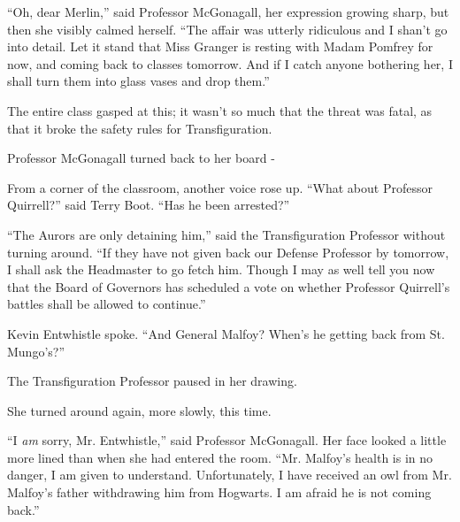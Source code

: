 ``Oh, dear Merlin,'' said Professor McGonagall, her expression growing
sharp, but then she visibly calmed herself. ``The affair was utterly
ridiculous and I shan't go into detail. Let it stand that Miss Granger
is resting with Madam Pomfrey for now, and coming back to classes
tomorrow. And if I catch anyone bothering her, I shall turn them into
glass vases and drop them.''

The entire class gasped at this; it wasn't so much that the threat was
fatal, as that it broke the safety rules for Transfiguration.

Professor McGonagall turned back to her board -

From a corner of the classroom, another voice rose up. ``What about
Professor Quirrell?'' said Terry Boot. ``Has he been arrested?''

``The Aurors are only detaining him,'' said the Transfiguration
Professor without turning around. ``If they have not given back our
Defense Professor by tomorrow, I shall ask the Headmaster to go fetch
him. Though I may as well tell you now that the Board of Governors has
scheduled a vote on whether Professor Quirrell's battles shall be
allowed to continue.''

Kevin Entwhistle spoke. ``And General Malfoy? When's he getting back
from St. Mungo's?''

The Transfiguration Professor paused in her drawing.

She turned around again, more slowly, this time.

``I \emph{am} sorry, Mr. Entwhistle,'' said Professor McGonagall. Her
face looked a little more lined than when she had entered the room.
``Mr. Malfoy's health is in no danger, I am given to understand.
Unfortunately, I have received an owl from Mr. Malfoy's father
withdrawing him from Hogwarts. I am afraid he is not coming back.''
